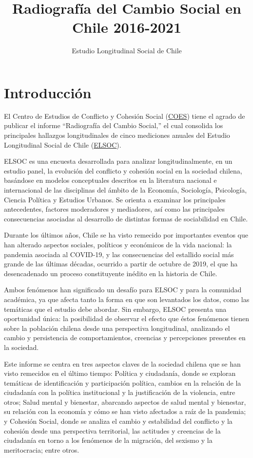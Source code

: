 \documentclass[
  12pt,
]{book}
\title{Radiografía del Cambio Social en Chile 2016-2021}
\subtitle{Estudio Longitudinal Social de Chile}
\author{}
\date{\vspace{-2.5em}}
\begin{document}
\maketitle

{
\hypersetup{linkcolor=}
\setcounter{tocdepth}{1}
\tableofcontents
}
\listoffigures
\listoftables
{}
\hypertarget{introducciuxf3n}{%
\chapter*{Introducción}\label{introducciuxf3n}}

El Centro de Estudios de Conflicto y Cohesión Social (\href{https://coes.cl/}{COES}) tiene el agrado de publicar el informe ``Radiografía del Cambio Social,'' el cual consolida los principales hallazgos longitudinales de cinco mediciones anuales del Estudio Longitudinal Social de Chile (\href{https://coes.cl/encuesta-panel/}{ELSOC}).

ELSOC es una encuesta desarrollada para analizar longitudinalmente, en un estudio panel, la evolución del conflicto y cohesión social en la sociedad chilena, basándose en modelos conceptuales descritos en la literatura nacional e internacional de las disciplinas del ámbito de la Economía, Sociología, Psicología, Ciencia Política y Estudios Urbanos. Se orienta a examinar los principales antecedentes, factores moderadores y mediadores, así como las principales consecuencias asociadas al desarrollo de distintas formas de sociabilidad en Chile.

Durante los últimos años, Chile se ha visto remecido por importantes eventos que han alterado aspectos sociales, políticos y económicos de la vida nacional: la pandemia asociada al COVID-19, y las consecuencias del estallido social más grande de las últimas décadas, ocurrido a partir de octubre de 2019, el que ha desencadenado un proceso constituyente inédito en la historia de Chile.

Ambos fenómenos han significado un desafío para ELSOC y para la comunidad académica, ya que afecta tanto la forma en que son levantados los datos, como las temáticas que el estudio debe abordar. Sin embargo, ELSOC presenta una oportunidad única: la posibilidad de observar el efecto que éstos fenómenos tienen sobre la población chilena desde una perspectiva longitudinal, analizando el cambio y persistencia de comportamientos, creencias y percepciones presentes en la sociedad.

Este informe se centra en tres aspectos claves de la sociedad chilena que se han visto remecidos en el último tiempo: Política y ciudadanía, donde se exploran temáticas de identificación y participación política, cambios en la relación de la ciudadanía con la política institucional y la justificación de la violencia, entre otros; Salud mental y bienestar, abarcando aspectos de salud mental y bienestar, su relación con la economía y cómo se han visto afectados a raíz de la pandemia; y Cohesión Social, donde se analiza el cambio y estabilidad del conflicto y la cohesión desde una perspectiva territorial, las actitudes y creencias de la ciudadanía en torno a los fenómenos de la migración, del sexismo y la meritocracia; entre otros.
\end{document}
